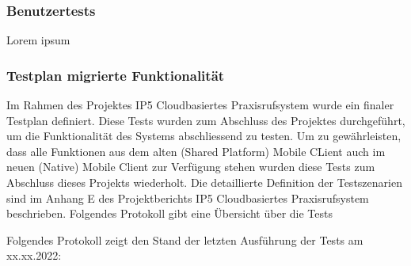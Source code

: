 \subsubsection{Benutzertests}

Lorem ipsum

\clearpage

\subsubsection{Testplan migrierte Funktionalität}

Im Rahmen des Projektes IP5 Cloudbasiertes Praxisrufsystem wurde ein finaler Testplan definiert.
Diese Tests wurden zum Abschluss des Projektes durchgeführt, um die Funktionalität des Systems abschliessend zu testen.
Um zu gewährleisten, dass alle Funktionen aus dem alten (Shared Platform) Mobile CLient auch im neuen (Native) Mobile Client zur Verfügung stehen wurden diese Tests zum Abschluss dieses Projekts wiederholt.
Die detaillierte Definition der Testszenarien sind im Anhang E des Projektberichts IP5 Cloudbasiertes Praxisrufsystem beschrieben.\cite{ip5}
Folgendes Protokoll gibt eine Übersicht über die Tests

Folgendes Protokoll zeigt den Stand der letzten Ausführung der Tests am xx.xx.2022:

